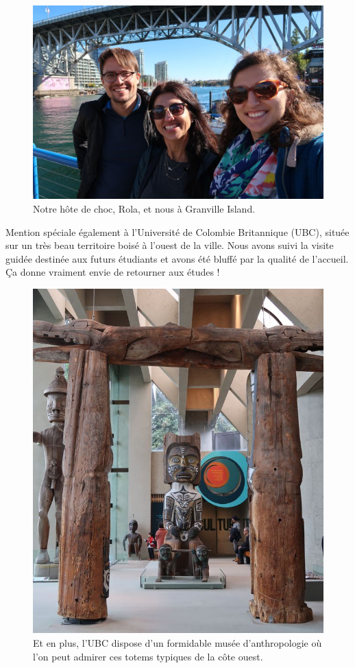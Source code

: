 \begin{figure}
\centering
\includegraphics{images/20181016_granville.JPG}
\caption{Notre hôte de choc, Rola, et nous à Granville Island.}
\end{figure}

Mention spéciale également à l'Université de Colombie Britannique (UBC),
située sur un très beau territoire boisé à l'ouest de la ville. Nous
avons suivi la visite guidée destinée aux futurs étudiants et avons été
bluffé par la qualité de l'accueil. Ça donne vraiment envie de retourner
aux études !

\begin{figure}
\centering
\includegraphics{images/20181016_ubc.JPG}
\caption{Et en plus, l'UBC dispose d'un formidable musée d'anthropologie
où l'on peut admirer ces totems typiques de la côte ouest.}
\end{figure}


